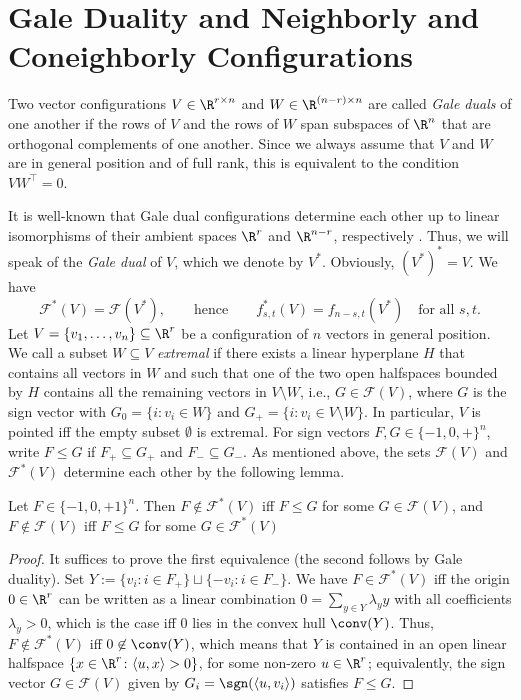 \section{Gale Duality and Neighborly and Coneighborly Configurations}
\label{sec:Gale}
%
\begin{definition} 
\label{def:Gale}
Two vector configurations $V \in \R^{r\times n}$ and $W\in \R^{(n-r)\times n}$ are called \emph{Gale duals} of one another if the rows of $V$ and the rows of $W$ span subspaces of $\R^n$ that are orthogonal complements of one another. Since we always assume that $V$ and $W$ are in general position and of full rank, this is equivalent to the condition $VW^{\top} = 0$.
\end{definition}
%
It is well-known  that 
Gale dual configurations determine each other up to linear isomorphisms of their ambient spaces $\R^r$ and $\R^{n-r}$, respectively \cite[Sec.~5.6]{Matousek:2002aa}. Thus, we will speak of the \emph{Gale dual} of $V$, which we denote by $V^*$. Obviously, $(V^*)^*=V$.
We have 
\[\mathcal{F}^{*}(V)=\mathcal{F}(V^*),\qquad \textrm{hence} \qquad f^*_{s,t}(V)=f_{n-s,t}(V^*)\quad \textrm{for all }s,t.\]
%
%
Let $V=\{v_1,\dots,v_n\}\subseteq \R^r$ be a configuration of $n$ vectors in general position. We call a subset $W\subseteq V$ \emph{extremal} if there exists a linear hyperplane $H$ that contains all vectors in $W$ and such that one of the two open halfspaces bounded by $H$ contains all the remaining vectors in $V\setminus W$, i.e., $G\in \mathcal{F}(V)$, where $G$ is the sign vector with $G_0=\{i\colon v_i \in W\}$ and $G_+=\{i\colon v_i \in V\setminus W\}$. In particular, $V$ is pointed iff the empty subset $\emptyset$ is extremal.
%
For sign vectors $F,G \in \{-1,0,+\}^n$, write $F\leq G$ if $F_+ \subseteq G_+$ and $F_- \subseteq G_-$. As mentioned above, the sets $\mathcal{F}(V)$ and $\mathcal{F}^*(V)$ determine each other by the following lemma. 
\begin{lemma}
\label{lem:Farkas}
Let $F\in \{-1,0,+1\}^n$. Then $F\not\in \mathcal{F}^*(V)$ iff $F\leq G$ for some $G\in \mathcal{F}(V)$, and $F\not\in \mathcal{F}(V)$ iff $F\leq G$ for some $G\in \mathcal{F}^*(V)$
\end{lemma}
\begin{proof}
It suffices to prove the first equivalence (the second follows by Gale duality). Set $Y:=\{v_i \colon i\in F_+\} \sqcup \{-v_i \colon i\in F_-\}$. We have $F\in \mathcal{F}^*(V)$ iff the origin $0\in \R^r$ can be written as a linear combination 
$0=\sum_{y \in Y} \lambda_y y$ with all coefficients $\lambda_y>0$, which is the case iff $0$ lies in the convex hull $\conv(Y)$. Thus, $F\not\in \mathcal{F}^*(V)$ iff $0\not\in \conv(Y)$, which means that $Y$ is contained in an open linear halfspace $\{x\in \R^r\colon \langle u,x\rangle >0\}$, for some non-zero $u\in \R^r$; equivalently, the sign vector $G\in \mathcal{F}(V)$ given by $G_i =\sgn(\langle u,v_i\rangle)$ satisfies $F\leq G$.
\end{proof}

